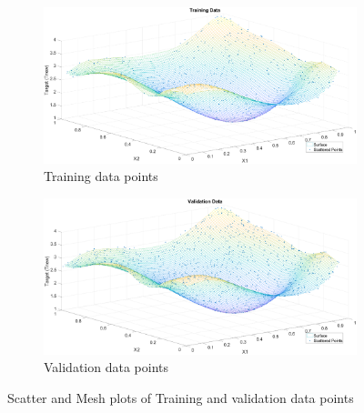 \begin{figure}[!htpb]
	\centering
	\begin{subfigure}[b]{0.5\textwidth}
		\captionsetup{width=0.8\linewidth, format = hang}
		\includegraphics[height = 0.6\textwidth,width = 1\textwidth]{Exercise1/Report/pers_reg_train}
		\caption{Training data points }\label{fig:train}
	\end{subfigure}%
	\begin{subfigure}[b]{0.5\textwidth}
		\captionsetup{width=0.8\linewidth, format = hang}
		\includegraphics[height = 0.6\textwidth,width = 1\textwidth]{Exercise1/Report/pers_reg_val}
		\caption{Validation data points}\label{fig:val}
	\end{subfigure}%
	\caption{Scatter and Mesh plots of Training and validation data points}
	\label{fig:data}
\end{figure}

